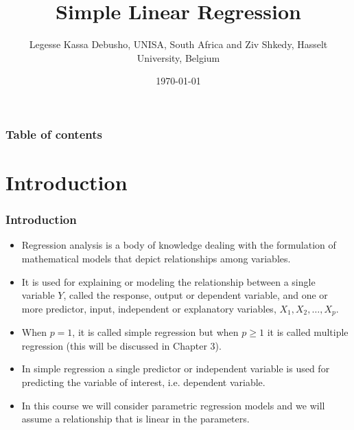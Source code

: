 \documentclass{beamer}
\begin{document}
\def \bb{\mbox{\boldmath $\beta$}}
\def \mm{\mbox{\boldmath $\mu$}}
\def \ee{\mbox{\boldmath $\varepsilon$}}
\def \vv{\mbox{\boldmath $V$}}
\def \xx{\mbox{\boldmath $X$}}
\def \tt{\mbox{\boldmath $\theta$}}
\def \ll{\mbox{\boldmath $\lambda$}}
\def \s{\sigma}
\def \b{\beta}
\def \g{\gamma}
\def \ds{\displaystyle}
\def \ul{\underline}
\def \R{I \!\! R}
\def \d{\delta}
\def \r{\rho}
\def \tilt{\tilde{t}}
\def \ss{\mbox{\boldmath $\Sigma$}}
\def \bt{\mbox{\boldmath $\tau$}}
\def \aa{\mbox{\boldmath $\alpha$}}
\def \ee{\mbox{\boldmath $\epsilon$}}
\def \ll{\mbox{\boldmath $\lambda$}}
\def \t{\mbox{\boldmath $\tau$}}

\title{Simple Linear Regression}
\author{Legesse Kassa Debusho, UNISA, South Africa and Ziv Shkedy, Hasselt University, Belgium}
\date{\today}

\begin{frame}
\titlepage
\end{frame}

\begin{frame}\frametitle{Table of contents}\tableofcontents
\end{frame}

\section{Introduction}
\begin{frame}\frametitle{Introduction}
\begin{itemize}
\item Regression analysis is a body of knowledge dealing with the formulation of mathematical models that depict relationships among variables.
\item It is used for explaining or modeling the relationship between a single variable $Y$, called the response, output or dependent variable, and one or more predictor, input, independent or explanatory variables, $X_1, X_2,\ldots, X_p$.
\item When $p=1$, it is called simple regression but when $p \ge 1$ it is called multiple regression (this will be discussed in Chapter 3).
\item In simple regression a single predictor or independent variable is used for predicting the variable of interest, i.e. dependent variable.
\item In this course we will consider parametric regression models and we will assume a relationship that is linear in the parameters.
\end{itemize}
\end{frame}
\end{document}
